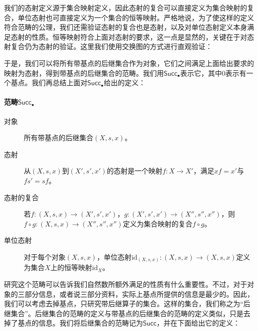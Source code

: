 \documentclass[oneside, 12pt]{ctexart}
\begin{document}
我们的态射定义源于集合映射定义，因此态射的复合可以直接定义为集合映射的复合，单位态射也可直接定义为一个集合的恒等映射。严格地说，为了使这样的定义符合范畴的公理，我们还需验证态射的复合也是态射，以及对单位态射定义本身满足态射的性质。恒等映射符合上面对态射的要求，这一点是显然的，关键在于对态射复合仍为态射的验证。这里我们使用交换图的方式进行直观验证：
\begin{center}
\end{center}

于是，我们可以将所有带基点的后继集合作为对象，它们之间满足上面给出要求的映射为态射，得到带基点的后继集合的范畴。我们用$\mathsf{Succ_\bullet}$表示它，其中$0$表示有一个基点。我们再总结上面对$\mathsf{Succ_\bullet}$给出的定义：

\paragraph{范畴$\mathsf{Succ_\bullet}$}
\begin{description}
	\item[对象] 所有带基点的后继集合$(X, s, x)$。
	\item[态射] 从$(X, s, x)$到$(X', s', x')$的态射是一个映射$f \colon X \to X'$，满足$xf = x'$与$fs' = sf$。
	\item[态射的复合] 若$f \colon (X, s, x) \to (X', s', x')$，$g \colon (X', s', x') \to (X'', s'', x'')$，则$f \circ g \colon (X, s, x) \to (X'', s'', x'')$定义为集合映射的复合$f \circ g$。
	\item[单位态射] 对于每个对象$(X, s, x)$，单位态射$\text{id}_{(X, s, x)} \colon (X, s, x) \to (X, s, x)$定义为集合$X$上的恒等映射$\text{id}_X$。
\end{description}

研究这个范畴可以告诉我们自然数所额外满足的性质有什么重要性。不过，对于对象的三部分信息，或者说三部分资料，实际上基点所提供的信息是最少的。因此，我们可以考虑去掉基点，只研究带后继算子的集合。这样的集合，我们称之为“后继集合”。后继集合的范畴的定义与带基点的后继集合的范畴的定义类似，只是去掉了基点的信息。我们将后继集合的范畴记为$\mathsf{Succ}$，并在下面给出它的定义：
\end{document}
